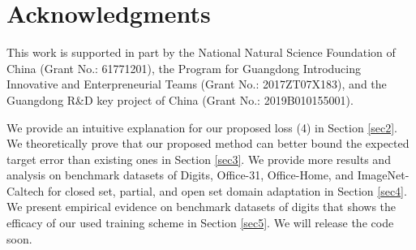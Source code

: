 \documentclass[letterpaper]{article} \usepackage{aaai20}  \usepackage{times}  \usepackage{helvet} \usepackage{courier}  \usepackage[hyphens]{url}  \usepackage{graphicx} \urlstyle{rm} \def\UrlFont{\rm}  \usepackage{graphicx}  \frenchspacing  \setlength{\pdfpagewidth}{8.5in}  \setlength{\pdfpageheight}{11in}
\begin{document}
\section{Acknowledgments}
This work is supported in part by the National Natural Science Foundation of China (Grant No.: 61771201), the Program for Guangdong Introducing Innovative and Enterpreneurial Teams (Grant No.: 2017ZT07X183), and the Guangdong R\&D key project of China (Grant No.: 2019B010155001).

\fontsize{9.0pt}{10.0pt} \selectfont 


\clearpage

\appendix

\newtheorem{proposition}{Proposition}
\newtheorem{theorem}{Theorem}
\newtheorem{definition}{Definition}


\setcounter{secnumdepth}{2}

We provide an intuitive explanation for our proposed loss (4) in Section \ref{sec2}. We theoretically prove that our proposed method can better bound the expected target error than existing ones in Section \ref{sec3}. We provide more results and analysis on benchmark datasets of Digits, Office-31, Office-Home, and ImageNet-Caltech for closed set, partial, and open set domain adaptation in Section \ref{sec4}. We present empirical evidence on benchmark datasets of digits that shows the efficacy of our used training scheme in Section \ref{sec5}. We will release the code soon.
\end{document}
